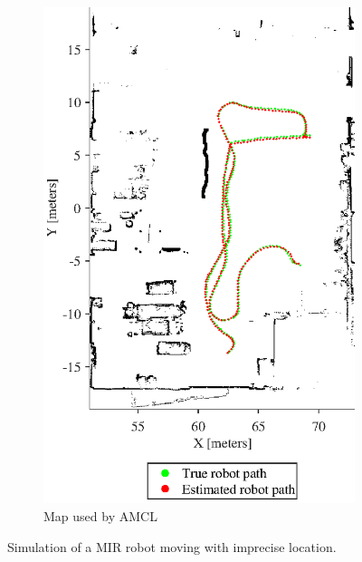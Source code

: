 \begin{figure}[tbph]
\begin{subfigure}[t]{0.45\textwidth}
		\label{fig:simulated_small_world}
	\end{subfigure}
	~ %
	\begin{subfigure}[t]{0.45\textwidth}
		\includegraphics[width=\textwidth]{figures/static_mapping/simulation_poses_amcl_map}
		\caption{Map used by AMCL}
		\label{fig:simulated_small_amcl_map}
	\end{subfigure}
	\caption{Simulation of a MIR robot moving with imprecise location.}
	\label{fig:test_map_setup}
\end{figure}

